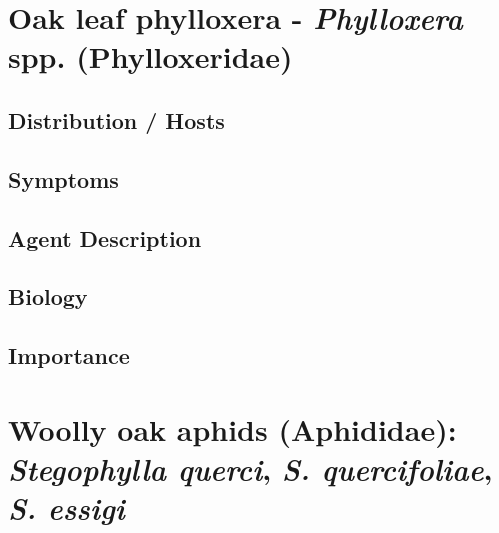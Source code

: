 \documentclass[
]{book}
\begin{document}
\section*{\texorpdfstring{Oak leaf phylloxera - \emph{Phylloxera} spp. (Phylloxeridae)}{Oak leaf phylloxera - Phylloxera spp. (Phylloxeridae)}}\label{oak-leaf-phylloxera---phylloxera-spp.-phylloxeridae}

\subsection*{Distribution / Hosts}\label{distribution-hosts-13}

\subsection*{Symptoms}\label{symptoms-13}

\subsection*{Agent Description}\label{agent-description-13}

\subsection*{Biology}\label{biology-13}

\subsection*{Importance}\label{importance-13}

\section*{\texorpdfstring{Woolly oak aphids (Aphididae): \emph{Stegophylla querci}, \emph{S. quercifoliae}, \emph{S. essigi}}{Woolly oak aphids (Aphididae): Stegophylla querci, S. quercifoliae, S. essigi}}\label{woolly-oak-aphids-aphididae-stegophylla-querci-s.-quercifoliae-s.-essigi}
\end{document}
